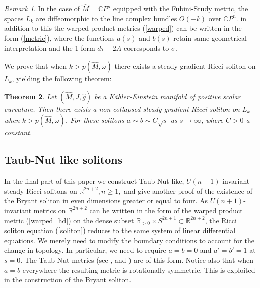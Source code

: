 \documentclass{amsart}
\newtheorem{thm}{Theorem}[section]
\theoremstyle{definition}
\theoremstyle{remark}
\newtheorem{remark}[thm]{Remark}
\numberwithin{equation}{section}
\newcommand{\R}{\mathbb{R}}  %
\begin{document}
\begin{remark}
In the case of $\hat{M} = \mathbb{C}P^n$ equipped with the Fubini-Study metric, the spaces $L_k$ are diffeomorphic to the line complex bundles $O(-k)$ over
$\mathbb{C}P^n$. in addition to this the warped product metrics (\ref{warped}) can be written in the form (\ref{metric}), where the functions $a(s)$ and $b(s)$ retain same geometrical interpretation and the 1-form $d\tau -2 A$ corresponds to $\sigma$.
\end{remark}

We prove that when $k > p(\hat{M}, \omega)$ there exists a steady gradient Ricci soliton on $L_k$, yielding the following theorem:
\begin{thm}
\label{main-thm}
Let $(\hat{M}, J, \hat{g})$ be a K\"ahler-Einstein manifold of positive scalar curvature. Then there exists a non-collapsed steady gradient Ricci soliton on $L_{k}$ when $k > p(\hat{M}, \omega)$. For these solitons $a \sim b \sim C \sqrt{s}$ as $s\rightarrow \infty$, where $C>0$ a constant.
\end{thm}

\subsection{Taub-Nut like solitons}

In the final part of this paper we construct Taub-Nut like, $U(n+1)$-invariant steady Ricci solitons on $\mathbb{R}^{2n+2}, n \geq 1,$ and give another proof of the existence of the Bryant soliton in even dimensions greater or equal to four. As $U(n+1)$-invariant metrics on $\R^{2n+2}$ can be written in 
the form of the warped product metric (\ref{warped_hd}) on the dense subset $\R_{>0} \times S^{2n+1} \subset \mathbb{R}^{2n+2}$, the Ricci soliton equation (\ref{soliton}) reduces to the same system of linear differential equations. We merely need to modify the boundary conditions to account for the change in topology. In particular, we need to require $a=b=0$ and $a'=b'=1$ at $s=0$. The Taub-Nut metrics (see \cite{T51}, \cite{H77} and \cite{BB85}) are of this form. Notice also that when $a=b$ everywhere the resulting metric is rotationally symmetric. This is exploited in the construction of the Bryant soliton.
\end{document}

